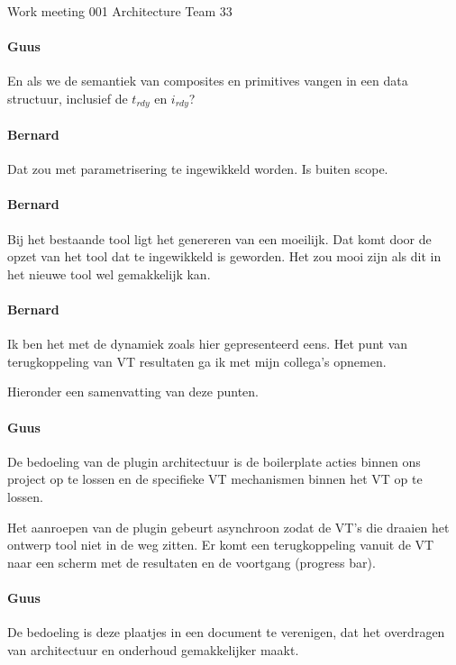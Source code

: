 \documentclass[a4paper,final]{article}
\begin{document}
\begin{Minutes}{Work meeting 001 Architecture Team 33}
\paragraph{Guus} En als we de semantiek van composites en primitives vangen in een data structuur,
inclusief de $t_{rdy}$ en $i_{rdy}$?

\paragraph{Bernard} Dat zou met parametrisering te ingewikkeld worden. Is buiten scope.


\paragraph{Bernard} Bij het bestaande tool ligt het genereren van een  moeilijk. Dat
komt door de opzet van het tool dat te ingewikkeld is geworden. Het zou mooi zijn als dit in
het nieuwe tool wel gemakkelijk kan. 


\paragraph{Bernard} Ik ben het met de dynamiek zoals hier gepresenteerd eens. Het punt van
terugkoppeling van VT resultaten ga ik met mijn collega's opnemen. 

Hieronder een samenvatting van deze punten.


\paragraph{Guus} De bedoeling van de plugin architectuur is de boilerplate
acties binnen ons project op te lossen en de specifieke VT mechanismen binnen
het VT op te lossen.

Het aanroepen van de plugin gebeurt asynchroon zodat de VT's die draaien het
ontwerp tool niet in de weg zitten. Er komt een terugkoppeling vanuit de VT
naar een scherm met de resultaten en de voortgang (progress bar).


\paragraph{Guus} De bedoeling is deze plaatjes in een document te verenigen, dat
het overdragen van architectuur en onderhoud gemakkelijker maakt.


\end{Minutes}
\end{document}
